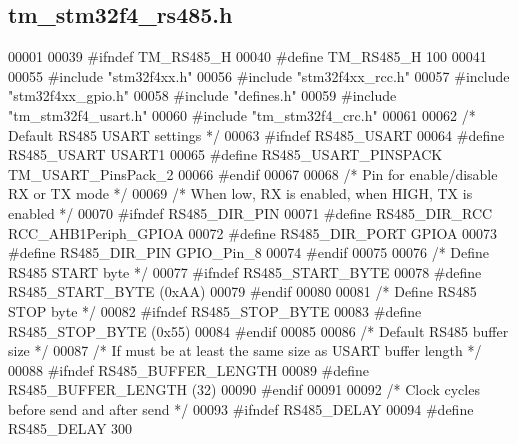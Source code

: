 \hypertarget{tm__stm32f4__rs485_8h_source}{}\subsection{tm\+\_\+stm32f4\+\_\+rs485.\+h}

\begin{DoxyCode}
00001 
00039 \textcolor{preprocessor}{#ifndef TM\_RS485\_H}
00040 \textcolor{preprocessor}{#define TM\_RS485\_H 100}
00041 
00055 \textcolor{preprocessor}{#include "stm32f4xx.h"}
00056 \textcolor{preprocessor}{#include "stm32f4xx\_rcc.h"}
00057 \textcolor{preprocessor}{#include "stm32f4xx\_gpio.h"}
00058 \textcolor{preprocessor}{#include "defines.h"}
00059 \textcolor{preprocessor}{#include "tm\_stm32f4\_usart.h"}
00060 \textcolor{preprocessor}{#include "tm\_stm32f4\_crc.h"}
00061 
00062 \textcolor{comment}{/* Default RS485 USART settings */}
00063 \textcolor{preprocessor}{#ifndef RS485\_USART}
00064 \textcolor{preprocessor}{#define RS485\_USART             USART1}
00065 \textcolor{preprocessor}{#define RS485\_USART\_PINSPACK    TM\_USART\_PinsPack\_2}
00066 \textcolor{preprocessor}{#endif}
00067 
00068 \textcolor{comment}{/* Pin for enable/disable RX or TX mode */}
00069 \textcolor{comment}{/* When low, RX is enabled, when HIGH, TX is enabled */}
00070 \textcolor{preprocessor}{#ifndef RS485\_DIR\_PIN}
00071 \textcolor{preprocessor}{#define RS485\_DIR\_RCC           RCC\_AHB1Periph\_GPIOA}
00072 \textcolor{preprocessor}{#define RS485\_DIR\_PORT          GPIOA}
00073 \textcolor{preprocessor}{#define RS485\_DIR\_PIN           GPIO\_Pin\_8}
00074 \textcolor{preprocessor}{#endif}
00075 
00076 \textcolor{comment}{/* Define RS485 START byte */}
00077 \textcolor{preprocessor}{#ifndef RS485\_START\_BYTE    }
00078 \textcolor{preprocessor}{#define RS485\_START\_BYTE        (0xAA)}
00079 \textcolor{preprocessor}{#endif}
00080 
00081 \textcolor{comment}{/* Define RS485 STOP byte */}
00082 \textcolor{preprocessor}{#ifndef RS485\_STOP\_BYTE         }
00083 \textcolor{preprocessor}{#define RS485\_STOP\_BYTE         (0x55)}
00084 \textcolor{preprocessor}{#endif}
00085 
00086 \textcolor{comment}{/* Default RS485 buffer size */}
00087 \textcolor{comment}{/* If must be at least the same size as USART buffer length */}
00088 \textcolor{preprocessor}{#ifndef RS485\_BUFFER\_LENGTH}
00089 \textcolor{preprocessor}{#define RS485\_BUFFER\_LENGTH     (32)}
00090 \textcolor{preprocessor}{#endif}
00091 
00092 \textcolor{comment}{/* Clock cycles before send and after send */}
00093 \textcolor{preprocessor}{#ifndef RS485\_DELAY}
00094 \textcolor{preprocessor}{#define RS485\_DELAY             300}

\end{DoxyCode}
